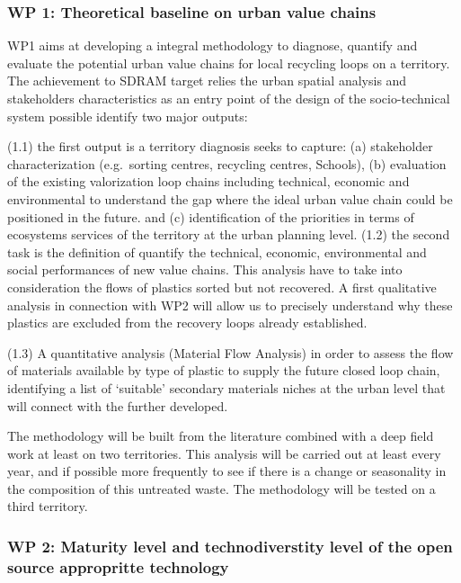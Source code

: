\documentclass[
  11pt,
  a4paperpaper,
  onecolumn]{article}
\begin{document}
\hypertarget{wp-1-theoretical-baseline-on-urban-value-chains}{%
\subsubsection{WP 1: Theoretical baseline on urban value
chains}\label{wp-1-theoretical-baseline-on-urban-value-chains}}

WP1 aims at developing a integral methodology to diagnose, quantify and
evaluate the potential urban value chains for local recycling loops on a
territory. The achievement to SDRAM target relies the urban spatial
analysis and stakeholders characteristics as an entry point of the
design of the socio-technical system possible identify two major
outputs:

(1.1) the first output is a territory diagnosis seeks to capture: (a)
stakeholder characterization (e.g.~sorting centres, recycling centres,
Schools), (b) evaluation of the existing valorization loop chains
including technical, economic and environmental to understand the gap
where the ideal urban value chain could be positioned in the future. and
(c) identification of the priorities in terms of ecosystems services of
the territory at the urban planning level. (1.2) the second task is the
definition of quantify the technical, economic, environmental and social
performances of new value chains. This analysis have to take into
consideration the flows of plastics sorted but not recovered. A first
qualitative analysis in connection with WP2 will allow us to precisely
understand why these plastics are excluded from the recovery loops
already established.

(1.3) A quantitative analysis (Material Flow Analysis) in order to
assess the flow of materials available by type of plastic to supply the
future closed loop chain, identifying a list of `suitable' secondary
materials niches at the urban level that will connect with the further
developed.

The methodology will be built from the literature combined with a deep
field work at least on two territories. This analysis will be carried
out at least every year, and if possible more frequently to see if there
is a change or seasonality in the composition of this untreated waste.
The methodology will be tested on a third territory.

\hypertarget{wp-2-maturity-level-and-technodiverstity-level-of-the-open-source-appropritte-technology}{%
\subsubsection{WP 2: Maturity level and technodiverstity level of the
open source appropritte
technology}\label{wp-2-maturity-level-and-technodiverstity-level-of-the-open-source-appropritte-technology}}
\end{document}
